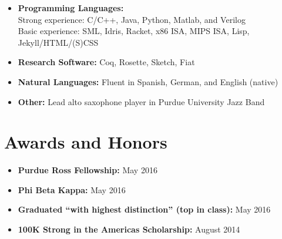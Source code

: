 \documentclass[10pt,a4paper,sans]{moderncv}        %
\begin{document}
\begin{itemize}

\item \textbf{Programming Languages:} \\
  Strong experience: C/C++, Java, Python, Matlab, and Verilog \\ Basic
  experience: SML, Idris, Racket, x86 ISA, MIPS ISA, Lisp,
  Jekyll/HTML/(S)CSS

\vspace{4pt}

\item \textbf{Research Software:} Coq, Rosette, Sketch, Fiat

\vspace{4pt}

\item \textbf{Natural Languages:} Fluent in Spanish, German, and English (native)

\vspace{4pt}

\item \textbf{Other:} Lead alto saxophone player in Purdue University
  Jazz Band

\end{itemize}

\section{Awards and Honors}

\vspace{4pt}

\begin{itemize}


\item \textbf{Purdue Ross Fellowship:} May 2016
\vspace{4pt}
\item \textbf{Phi Beta Kappa:} May 2016
\vspace{4pt}
\item \textbf{Graduated ``with highest distinction'' (top in class):} May 2016
\vspace{4pt}
\item \textbf{100K Strong in the Americas Scholarship:} August 2014

\end{itemize}

\end{document}
